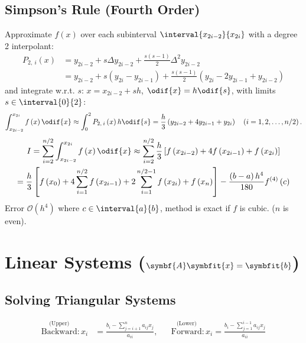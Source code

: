 \documentclass{article}
\begin{document}
\begin{minipage}[t]{126.1962963mm}
    \subsection{Simpson's Rule (Fourth Order)}
    Approximate \(f\left( x \right)\) over each subinterval \(\interval{x_{2i - 2}}{x_{2i}}\) with a degree 2 interpolant:
    \begin{align*}
        P_{2,\: i}\left( x \right) & = y_{2i - 2} + s \Delta{y_{2i - 2}} + \frac{s\left( s - 1 \right)}{2} \Delta^2 y_{2i - 2}                                               \\
                                   & = y_{2i - 2} + s \left( y_{2i} - y_{2i - 1} \right) + \frac{s\left( s - 1 \right)}{2} \left( y_{2i} - 2 y_{2i - 1} + y_{2i - 2} \right)
    \end{align*}
    and integrate w.r.t. \(s\): \(x = x_{2i - 2} + s h\), \(\odif{x} = h \odif{s}\), with limits \(s \in \interval{0}{2}\):
    \begin{equation*}
        \int_{x_{2i - 2}}^{x_{2i}} f\left( x \right) \odif{x} \approx \int_0^2 P_{2,\: i}\left( x \right) h \odif{s} = \frac{h}{3} \left( y_{2i - 2} + 4y_{2i - 1} + y_{2i} \right) \quad \left(i = 1, 2, \ldots, n/2\right).
    \end{equation*}
    \begin{multline*}
        I = \sum_{i = 2}^{n/2}\int_{x_{2i - 2}}^{x_{2i}} f\left( x \right) \odif{x} \approx \sum_{i = 2}^{n/2} \frac{h}{3} \left[ f\left( x_{2i - 2} \right) + 4f\left( x_{2i - 1} \right) + f\left( x_{2i} \right) \right]                                                                                                               \\
        = \frac{h}{3} \left[ f\left( x_0 \right) + 4 \sum_{i = 1}^{n/2} f\left( x_{2i - 1} \right) + 2 \sum_{i = 1}^{n/2 - 1} f\left( x_{2i} \right) + f\left( x_n \right) \right] - \frac{\left( b - a \right)h^4}{180} f^{\left( 4 \right)}\left( c \right)
    \end{multline*}
    Error \(\mathcal{O}\left( h^4 \right)\) where \(c \in \interval{a}{b}\), method is exact if \(f\) is cubic. (\(n\) is even).
    \section{Linear Systems (\texorpdfstring{\(\symbf{A} \symbfit{x} = \symbfit{b}\)}{A x = b})}
    \subsection{Solving Triangular Systems}
    \begin{align*}
        \overset{\text{(Upper)}}{\text{Backward}}: x_i & = \frac{b_i - \sum_{j = i + 1}^n a_{ij} x_j}{a_{ii}},
                                                       &                                                       & \overset{\text{(Lower)}}{\text{Forward}}: x_i = \frac{b_i - \sum_{j = 1}^{i - 1} a_{ij} x_j}{a_{ii}}
    \end{align*}

\end{minipage}
\end{document}
